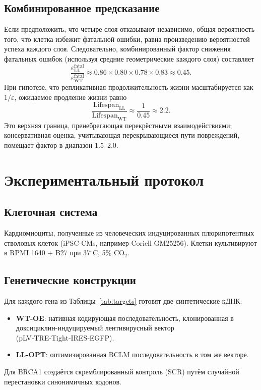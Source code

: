 \documentclass[12pt,a4paper]{article}
\begin{document}
	\subsection{Комбинированное предсказание}
	Если предположить, что четыре слоя отказывают независимо, общая вероятность того, что клетка избежит фатальной ошибки, равна произведению вероятностей успеха каждого слоя. Следовательно, комбинированный фактор снижения фатальных ошибок (используя средние геометрические каждого слоя) составляет
	\[
	\frac{\varepsilon_{\mathrm{LL}}^{\mathrm{fatal}}}{\varepsilon_{\mathrm{WT}}^{\mathrm{fatal}}} \approx 0.86 \times 0.80 \times 0.78 \times 0.83 \approx 0.45.
	\]
	При гипотезе, что репликативная продолжительность жизни масштабируется как \(1/\varepsilon\), ожидаемое продление жизни равно
	\[
	\frac{\mathrm{Lifespan}_{\mathrm{LL}}}{\mathrm{Lifespan}_{\mathrm{WT}}} \approx \frac{1}{0.45} \approx 2.2.
	\]
	Это верхняя граница, пренебрегающая перекрёстными взаимодействиями; консервативная оценка, учитывающая перекрывающиеся пути повреждений, помещает фактор в диапазон \(1.5\)–\(2.0\).
	
	\section{Экспериментальный протокол}
	\label{sec:protocol}
	
	\subsection{Клеточная система}
	Кардиомиоциты, полученные из человеческих индуцированных плюрипотентных стволовых клеток (iPSC‑CMs, например Coriell GM25256). Клетки культивируют в RPMI 1640 + B27 при 37\(^\circ\)C, 5\% CO\(_2\).
	
	\subsection{Генетические конструкции}
	Для каждого гена из Таблицы~\ref{tab:targets} готовят две синтетические кДНК:
	\begin{itemize}
		\item \textbf{WT‑OE}: нативная кодирующая последовательность, клонированная в доксициклин-индуцируемый лентивирусный вектор (pLV‑TRE‑Tight‑IRES‑EGFP).
		\item \textbf{LL‑OPT}: оптимизированная BCLM последовательность в том же векторе.
	\end{itemize}
	Для BRCA1 создаётся скремблированный контроль (SCR) путём случайной перестановки синонимичных кодонов.
	
\end{document}
